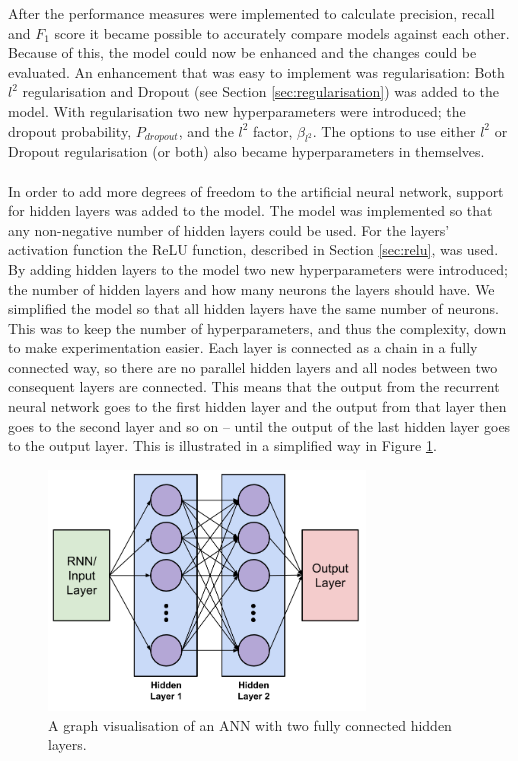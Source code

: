\label{sec:enhacing_the_model}
After the performance measures were implemented to calculate precision, recall and $F_1$ score it became possible to accurately compare models against each other. Because of this, the model could now be enhanced and the changes could be evaluated. An enhancement that was easy to implement was regularisation: Both $l^2$ regularisation and Dropout (see Section \ref{sec:regularisation}) was added to the model. With regularisation two new hyperparameters were introduced; the dropout probability, $P_{dropout}$, and the $l^2$ factor, $\beta_{l^2}$. The options to use either $l^2$ or Dropout regularisation (or both) also became hyperparameters in themselves.
\\\\
In order to add more degrees of freedom to the artificial neural network, support for hidden layers was added to the model. The model was implemented so that any non-negative number of hidden layers could be used. For the layers' activation function the ReLU function, described in Section \ref{sec:relu}, was used. By adding hidden layers to the model two new hyperparameters were introduced; the number of hidden layers and how many neurons the layers should have. We simplified the model so that all hidden layers have the same number of neurons. This was to keep the number of hyperparameters, and thus the complexity, down to make experimentation easier. Each layer is connected as a chain in a fully connected way, so there are no parallel hidden layers and all nodes between two consequent layers are connected. This means that the output from the recurrent neural network goes to the first hidden layer and the output from that layer then goes to the second layer and so on -- until the output of the last hidden layer goes to the output layer. This is illustrated in a simplified way in Figure \ref{fig:ann_hidden_layers}.
\begin{figure}[h!]
    \centering
    \includegraphics[width=0.75\textwidth]{figure/method/ann_hidden_layers}
    \caption{A graph visualisation of an ANN with two fully connected hidden layers.}
    \label{fig:ann_hidden_layers}
\end{figure}
